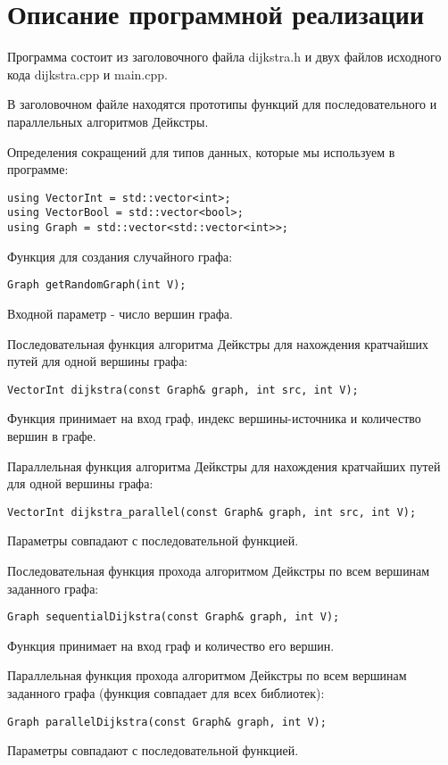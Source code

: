 \documentclass{report}
\begin{document}
\newpage

\section*{Описание программной реализации}
Программа состоит из заголовочного файла dijkstra.h и двух файлов исходного кода dijkstra.cpp и main.cpp.
\par В заголовочном файле находятся прототипы функций для последовательного и параллельных алгоритмов Дейкстры.
\par Определения сокращений для типов данных, которые мы используем в программе:
\begin{lstlisting}
using VectorInt = std::vector<int>;
using VectorBool = std::vector<bool>;
using Graph = std::vector<std::vector<int>>;
\end{lstlisting}

\par Функция для создания случайного графа:
\begin{lstlisting}
Graph getRandomGraph(int V);
\end{lstlisting}
Входной параметр - число вершин графа.

\par Последовательная функция алгоритма Дейкстры для нахождения кратчайших путей для одной вершины графа:
\begin{lstlisting}
VectorInt dijkstra(const Graph& graph, int src, int V);
\end{lstlisting}
Функция принимает на вход граф, индекс вершины-источника и количество вершин в графе.

\par Параллельная функция алгоритма Дейкстры для нахождения кратчайших путей для одной вершины графа:
\begin{lstlisting}
VectorInt dijkstra_parallel(const Graph& graph, int src, int V);
\end{lstlisting}
Параметры совпадают с последовательной функцией.

\par Последовательная функция прохода алгоритмом Дейкстры по всем вершинам заданного графа:
\begin{lstlisting}
Graph sequentialDijkstra(const Graph& graph, int V);
\end{lstlisting}
Функция принимает на вход граф и количество его вершин.

\par Параллельная функция прохода алгоритмом Дейкстры по всем вершинам заданного графа (функция совпадает для всех библиотек):
\begin{lstlisting}
Graph parallelDijkstra(const Graph& graph, int V);
\end{lstlisting}
Параметры совпадают с последовательной функцией.
\end{document}

